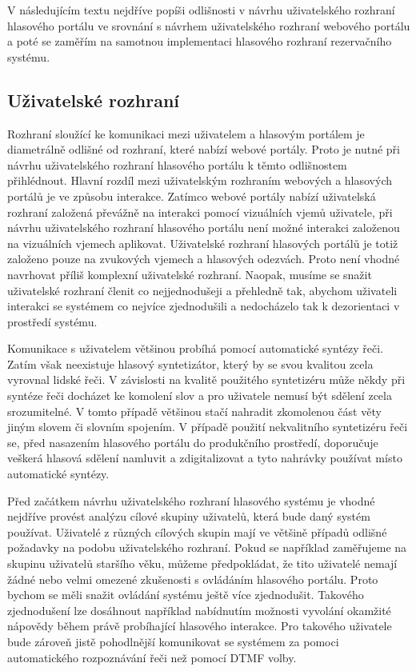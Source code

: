 \documentclass[ing,male,java,dept460]{diploma}						%
\begin{document}
V následujícím textu nejdříve popíši odlišnosti v návrhu uživatelského rozhraní hlasového portálu ve srovnání s návrhem uživatelského rozhraní webového portálu a poté se zaměřím na samotnou implementaci hlasového rozhraní rezervačního systému.

\subsection{Uživatelské rozhraní}
Rozhraní sloužící ke komunikaci mezi uživatelem a hlasovým portálem je diametrálně odlišné od rozhraní, které nabízí webové portály. Proto je nutné při návrhu uživatelského rozhraní hlasového portálu k těmto odlišnostem přihlédnout. Hlavní rozdíl mezi uživatelským rozhraním webových a hlasových portálů je ve způsobu interakce. Zatímco webové portály nabízí uživatelská rozhraní založená převážně na interakci pomocí vizuálních vjemů uživatele, při návrhu uživatelského rozhraní hlasového portálu není možné interakci založenou na vizuálních vjemech aplikovat. Uživatelské rozhraní hlasových portálů je totiž založeno pouze na zvukových vjemech a hlasových odezvách. Proto není vhodné navrhovat příliš komplexní uživatelské rozhraní. Naopak, musíme se snažit uživatelské rozhraní členit co nejjednodušeji a přehledně tak, abychom uživateli interakci se systémem co nejvíce zjednodušili a nedocházelo tak k dezorientaci v prostředí systému.

Komunikace s uživatelem většinou probíhá pomocí automatické syntézy řeči. Zatím však neexistuje hlasový syntetizátor, který by se svou kvalitou zcela vyrovnal lidské řeči. V závislosti na kvalitě použitého syntetizéru může někdy při syntéze řeči docházet ke komolení slov a pro uživatele nemusí být sdělení zcela srozumitelné. V tomto případě většinou stačí nahradit zkomolenou část věty jiným slovem či slovním spojením. V případě použití nekvalitního syntetizéru řeči se, před nasazením hlasového portálu do produkčního prostředí, doporučuje veškerá hlasová sdělení namluvit a zdigitalizovat a tyto nahrávky používat místo automatické syntézy.

Před začátkem návrhu uživatelského rozhraní hlasového systému je vhodné nejdříve provést analýzu cílové skupiny uživatelů, která bude daný systém používat. Uživatelé z různých cílových skupin mají ve většině případů odlišné požadavky na podobu uživatelského rozhraní. Pokud se například zaměřujeme na skupinu uživatelů staršího věku, můžeme předpokládat, že tito uživatelé nemají žádné nebo velmi omezené zkušenosti s ovládáním hlasového portálu. Proto bychom se měli snažit ovládání systému ještě více zjednodušit. Takového zjednodušení lze dosáhnout například nabídnutím možnosti vyvolání okamžité nápovědy během právě probíhající hlasového interakce. Pro takového uživatele bude zároveň jistě pohodlnější komunikovat se systémem za pomoci automatického rozpoznávání řeči než pomocí DTMF volby.
\end{document}
